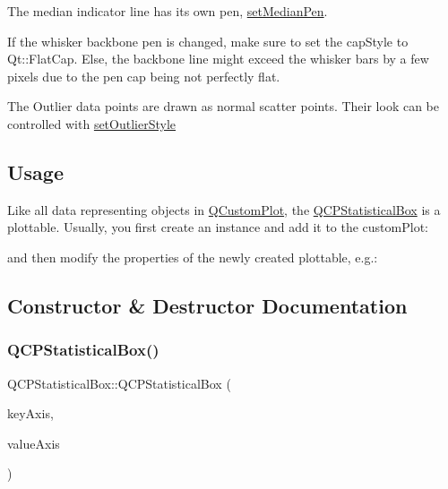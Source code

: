 The median indicator line has its own pen, \mbox{\hyperlink{class_q_c_p_statistical_box_a7260ac55b669f5d0a74f16d5ca84c52c}{set\+Median\+Pen}}.

If the whisker backbone pen is changed, make sure to set the cap\+Style to Qt\+::\+Flat\+Cap. Else, the backbone line might exceed the whisker bars by a few pixels due to the pen cap being not perfectly flat.

The Outlier data points are drawn as normal scatter points. Their look can be controlled with \mbox{\hyperlink{class_q_c_p_statistical_box_ad5241943422eb8e58360a97e99ad6aa7}{set\+Outlier\+Style}}\hypertarget{class_q_c_p_statistical_box_usage}{}\subsection{Usage}\label{class_q_c_p_statistical_box_usage}
Like all data representing objects in \mbox{\hyperlink{class_q_custom_plot}{Q\+Custom\+Plot}}, the \mbox{\hyperlink{class_q_c_p_statistical_box}{Q\+C\+P\+Statistical\+Box}} is a plottable. Usually, you first create an instance and add it to the custom\+Plot\+: 
\begin{DoxyCodeInclude}
\end{DoxyCodeInclude}
and then modify the properties of the newly created plottable, e.\+g.\+: 
\begin{DoxyCodeInclude}
\end{DoxyCodeInclude}


\subsection{Constructor \& Destructor Documentation}
\mbox{\label{class_q_c_p_statistical_box_a75c2b3e7fcd0741cc981693a2ba63b27}} 
\subsubsection{\texorpdfstring{Q\+C\+P\+Statistical\+Box()}{QCPStatisticalBox()}}
{\footnotesize\ttfamily Q\+C\+P\+Statistical\+Box\+::\+Q\+C\+P\+Statistical\+Box (\begin{DoxyParamCaption}\item[{\mbox{\hyperlink{class_q_c_p_axis}{Q\+C\+P\+Axis}} $\ast$}]{key\+Axis,  }\item[{\mbox{\hyperlink{class_q_c_p_axis}{Q\+C\+P\+Axis}} $\ast$}]{value\+Axis }\end{DoxyParamCaption})\hspace{0.3cm}{\ttfamily [explicit]}}

